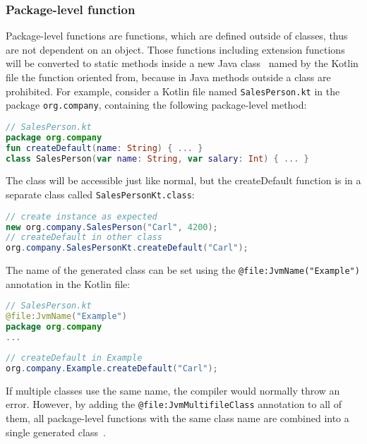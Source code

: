 \documentclass[a4paper,11pt]{article}
\begin{document}
\subsubsection{Package-level function}
Package-level functions are functions, which are defined outside of classes, thus are not dependent on an object. Those functions including extension functions will be converted to static methods inside a new Java class~\cite{interop-package-level-func} named by the Kotlin file the function oriented from, because in Java methods outside a class are prohibited. For example, consider a Kotlin file named \texttt{SalesPerson.kt} in the package \texttt{org.company}, containing the following package-level method:
\begin{lstlisting}[language=Kotlin]
// SalesPerson.kt
package org.company
fun createDefault(name: String) { ... }
class SalesPerson(var name: String, var salary: Int) { ... }
\end{lstlisting}
The class will be accessible just like normal, but the createDefault function is in a separate class called \texttt{SalesPersonKt.class}:
\begin{lstlisting}[language=Java]
// create instance as expected
new org.company.SalesPerson("Carl", 4200);
// createDefault in other class
org.company.SalesPersonKt.createDefault("Carl");
\end{lstlisting}
The name of the generated class can be set using the \texttt{@file:JvmName("Example")} annotation in the Kotlin file:
\begin{lstlisting}[language=Kotlin]
// SalesPerson.kt
@file:JvmName("Example")
package org.company
...
\end{lstlisting}
\begin{lstlisting}[language=Java]
// createDefault in Example
org.company.Example.createDefault("Carl");
\end{lstlisting}
If multiple classes use the same name, the compiler would normally throw an error. However, by adding the \texttt{@file:JvmMultifileClass} annotation to all of them, all package-level functions with the same class name are combined into a single generated class~\cite{interop-package-level-func}.
\end{document}
